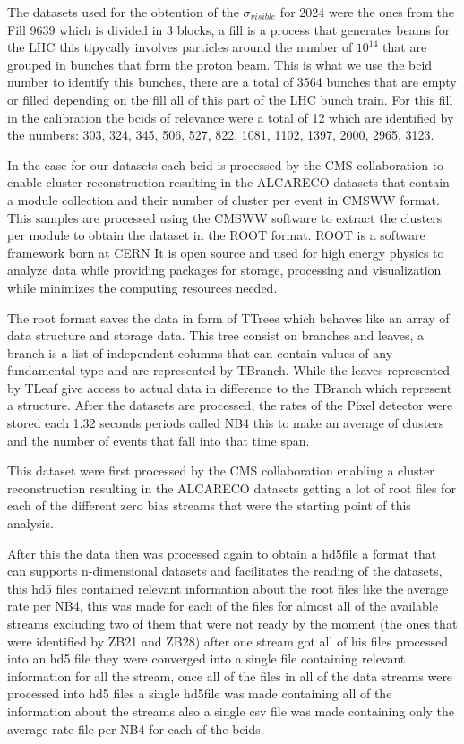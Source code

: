 The datasets used for the obtention of the $\sigma_{visible}$ for 2024 were the ones from the Fill 9639 which is divided in 3 blocks, a fill is a process that generates beams for the LHC this tipycally involves particles around the number of $10^{14}$ that are grouped in bunches that form the proton beam. This is what we use the bcid number to identify this bunches, there are a total of 3564 bunches that are empty or filled depending on the fill all of this part of the LHC bunch train. For this fill in the calibration the bcids of relevance were a total of 12 which are identified by the numbers: 303, 324, 345, 506, 527, 822, 1081, 1102, 1397, 2000, 2965, 3123. 

In the case for our datasets each bcid is processed by the CMS collaboration to enable cluster reconstruction resulting in the ALCARECO datasets that contain a module collection and their number of cluster per event in CMSWW format. This samples are processed using the CMSWW software to extract the clusters per module to obtain the dataset in the ROOT format. ROOT is a software framework born at CERN It is open source and used for high energy physics to analyze data while providing packages for storage, processing and visualization while minimizes the computing resources needed. 

The root format saves the data in form of TTrees which behaves like an array of data structure and storage data. This tree consist on branches and leaves, a branch is a list of independent columns that can contain values of any fundamental type and are represented by TBranch. While the leaves represented by TLeaf give access to actual data in difference to the TBranch which represent a structure. After the datasets are processed, the rates of the Pixel detector were stored each 1.32 seconds periods called NB4 this to make an average of clusters and the number of events that fall into that time span. 

This dataset were first processed by the CMS collaboration enabling a cluster reconstruction resulting in the ALCARECO datasets getting a lot of root files for each of the different zero bias streams that were the starting point of this analysis. 

After this the data then was processed again to obtain a hd5file a format that can supports n-dimensional datasets and facilitates the reading of the datasets, this hd5 files contained relevant information about the root files like the average rate per NB4, this was made for each of the files for almost all of the available streams excluding two of them that were not ready by the moment (the ones that were identified by ZB21 and ZB28) after one stream got all of his files processed into an hd5 file they were converged into a single file containing relevant information for all the stream, once all of the files in all of the data streams were processed into hd5 files a single hd5file was made containing all of the information about the streams also a single csv file was made containing only the average rate file per NB4 for each of the bcids.  

